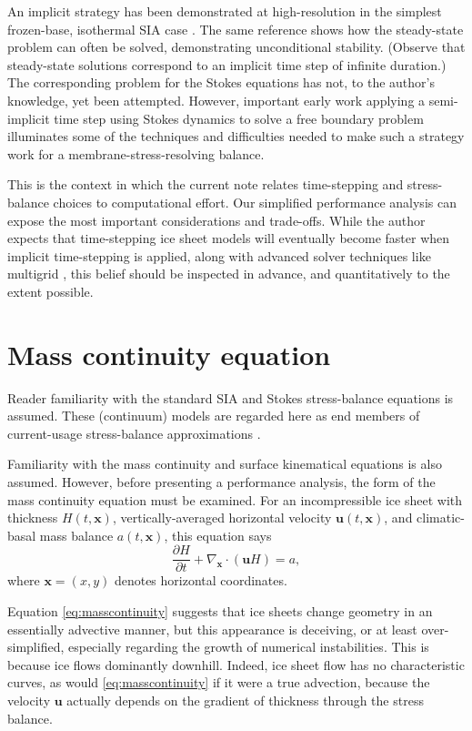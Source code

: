 \documentclass[twocolumn,letterpaper]{igs}
\newcommand\bu{\mathbf{u}}
\newcommand\bx{\mathbf{x}}
\newcommand{\Divx}{\nabla_\bx \cdot}
\begin{document}
An implicit strategy has been demonstrated at high-resolution in the simplest frozen-base, isothermal SIA case \citep{Bueler2016}.  The same reference shows how the steady-state problem \citep[compare][]{JouvetBueler2012} can often be solved, demonstrating unconditional stability.  (Observe that steady-state solutions correspond to an implicit time step of infinite duration.)  The corresponding problem for the Stokes equations has not, to the author's knowledge, yet been attempted.  However, important early work applying a semi-implicit time step using Stokes dynamics \citep{WirbelJarosch2020} to solve a free boundary problem illuminates some of the techniques and difficulties needed to make such a strategy work for a membrane-stress-resolving balance.

This is the context in which the current note relates time-stepping and stress-balance choices to computational effort.  Our simplified performance analysis can expose the most important considerations and trade-offs.  While the author expects that time-stepping ice sheet models will eventually become faster when implicit time-stepping is applied, along with advanced solver techniques like multigrid \citep{Briggsetal2000}, this belief should be inspected in advance, and quantitatively to the extent possible.


\section{Mass continuity equation}

Reader familiarity with the standard SIA and Stokes stress-balance equations \citep{GreveBlatter2009,SchoofHewitt2013} is assumed.  These (continuum) models are regarded here as end members of current-usage stress-balance approximations \citep{Robinsonetal2022}.

Familiarity with the mass continuity and surface kinematical equations \citep{GreveBlatter2009} is also assumed.  However, before presenting a performance analysis, the form of the mass continuity equation must be examined.  For an incompressible ice sheet with thickness $H(t,\bx)$, vertically-averaged horizontal velocity $\bu(t,\bx)$, and climatic-basal mass balance $a(t,\bx)$, this equation says
\begin{equation}
\frac{\partial H}{\partial t} + \Divx \left(\bu H\right) = a, \label{eq:masscontinuity}
\end{equation}
where $\bx=(x,y)$ denotes horizontal coordinates.

Equation \eqref{eq:masscontinuity} suggests that ice sheets change geometry in an essentially advective manner, but this appearance is deceiving, or at least over-simplified, especially regarding the growth of numerical instabilities.  This is because ice flows dominantly downhill.  Indeed, ice sheet flow has no characteristic curves, as would \eqref{eq:masscontinuity} if it were a true advection, because the velocity $\bu$ actually depends on the gradient of thickness through the stress balance.
\end{document}
